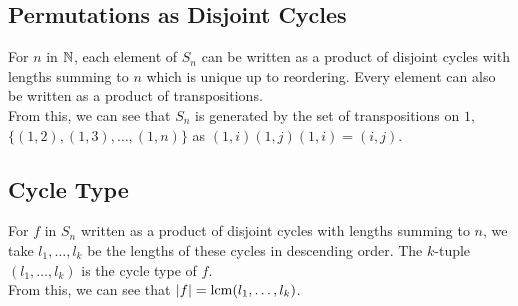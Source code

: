\subsection{Permutations as Disjoint Cycles}

For $n$ in $\mathbb{N}$, each element of $S_n$ can be written as a product of
disjoint cycles with lengths summing to $n$ which is unique up to reordering.
Every element can also be written as a product of transpositions.
\\[\baselineskip]
From this, we can see that $S_n$ is generated by the set of transpositions on
$1$, $\{(1, 2), (1, 3), \ldots, (1, n)\}$ as $(1, i)(1, j)(1, i) = (i, j)$.

\subsection{Cycle Type}

For $f$ in $S_n$ written as a product of disjoint cycles with lengths summing
to $n$, we take $l_1, \ldots, l_k$ be the lengths of these cycles in
descending order. The $k$-tuple $(l_1, \ldots, l_k)$ is the cycle type of $f$.
\\[\baselineskip]
From this, we can see that $|f| = \operatorname{lcm}(l_1, \ldots, l_k)$.